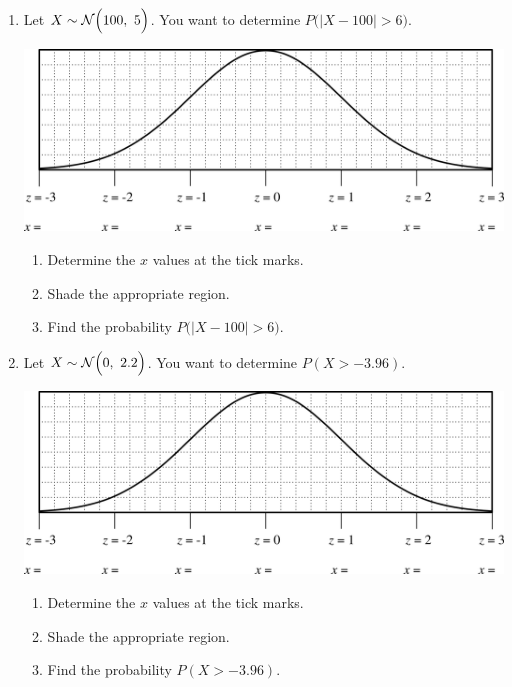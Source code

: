 \documentclass[12pt,letterpaper]{article}
\begin{document}
\begin{enumerate}
\vfill

\newpage

\item Let $X \sim \mathcal{N}\Big(100,~ 5\Big)$. You want to determine $P\Big(\big|X-100\big| > 6\Big)$.
\begin{center}
\includegraphics[scale=0.8]{curve.png}
\end{center}
\begin{enumerate}
\item Determine the $x$ values at the tick marks.
\item Shade the appropriate region.
\item Find the probability $P\Big(\big|X-100\big| > 6\Big)$.
\end{enumerate}

\vfill

\item Let $X \sim \mathcal{N}\Big(0,~ 2.2\Big)$. You want to determine $P(X>-3.96)$.
\begin{center}
\includegraphics[scale=0.8]{curve.png}
\end{center}
\begin{enumerate}
\item Determine the $x$ values at the tick marks.
\item Shade the appropriate region.
\item Find the probability $P(X > -3.96)$.
\end{enumerate}

\vfill

\newpage


\end{enumerate}
\end{document}
